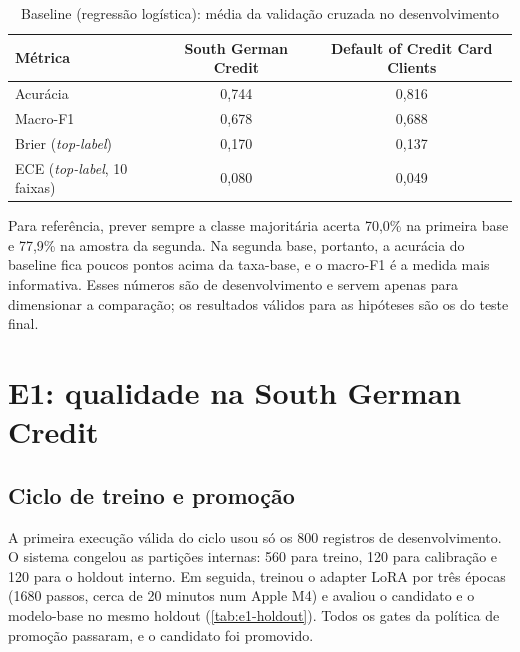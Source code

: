 \begin{table}[htb]
  \centering
  \caption{Baseline (regressão logística): média da validação cruzada no desenvolvimento}
  \label{tab:baseline-cv}
  \begin{tabular}{lcc}
    \toprule
    Métrica & South German Credit & Default of Credit Card Clients \\
    \midrule
    Acurácia & 0,744 & 0,816 \\
    Macro-F1 & 0,678 & 0,688 \\
    Brier (\emph{top-label}) & 0,170 & 0,137 \\
    ECE (\emph{top-label}, 10 faixas) & 0,080 & 0,049 \\
    \bottomrule
  \end{tabular}
\end{table}

Para referência, prever sempre a classe majoritária acerta 70,0\% na primeira base e 77,9\% na amostra da segunda. Na segunda base, portanto, a acurácia do baseline fica poucos pontos acima da taxa-base, e o macro-F1 é a medida mais informativa. Esses números são de desenvolvimento e servem apenas para dimensionar a comparação; os resultados válidos para as hipóteses são os do teste final.

\section{E1: qualidade na South German Credit}

\subsection{Ciclo de treino e promoção}

A primeira execução válida do ciclo  usou só os 800 registros de desenvolvimento. O sistema congelou as partições internas: 560 para treino, 120 para calibração e 120 para o holdout interno. Em seguida, treinou o adapter LoRA por três épocas (1680 passos, cerca de 20 minutos num Apple M4) e avaliou o candidato e o modelo-base no mesmo holdout (\autoref{tab:e1-holdout}). Todos os gates da política de promoção passaram, e o candidato foi promovido.

